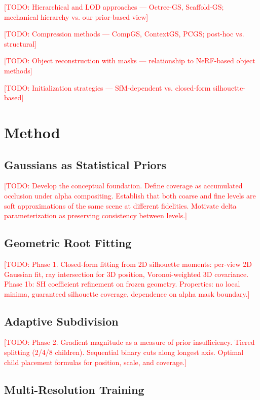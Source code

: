 \documentclass[acmtog]{acmart}
\newcommand{\todo}[1]{\textcolor{red}{[TODO: #1]}}
\begin{document}
\todo{Hierarchical and LOD approaches --- Octree-GS, Scaffold-GS; mechanical hierarchy vs. our prior-based view}

\todo{Compression methods --- CompGS, ContextGS, PCGS; post-hoc vs. structural}

\todo{Object reconstruction with masks --- relationship to NeRF-based object methods}

\todo{Initialization strategies --- SfM-dependent vs. closed-form silhouette-based}

\section{Method}

\subsection{Gaussians as Statistical Priors}

\todo{Develop the conceptual foundation. Define coverage as accumulated occlusion under alpha compositing. Establish that both coarse and fine levels are soft approximations of the same scene at different fidelities. Motivate delta parameterization as preserving consistency between levels.}

\subsection{Geometric Root Fitting}

\todo{Phase 1. Closed-form fitting from 2D silhouette moments: per-view 2D Gaussian fit, ray intersection for 3D position, Voronoi-weighted 3D covariance. Phase 1b: SH coefficient refinement on frozen geometry. Properties: no local minima, guaranteed silhouette coverage, dependence on alpha mask boundary.}

\subsection{Adaptive Subdivision}

\todo{Phase 2. Gradient magnitude as a measure of prior insufficiency. Tiered splitting (2/4/8 children). Sequential binary cuts along longest axis. Optimal child placement formulas for position, scale, and coverage.}

\subsection{Multi-Resolution Training}
\end{document}
